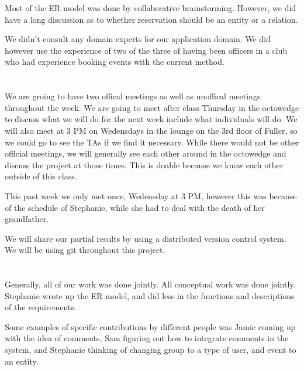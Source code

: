 \documentclass{article}
\begin{document}
Most of the ER model was done by collaberative brainstorming. However, we did
have a long discussion as to whether reservation should be an entity or a
relation.  

We didn't consult any domain experts for our application domain. We did however
use the experience of two of the three of having been officers in a club who had
experience booking events with the current method. 

\section{}
We are groing to have two offical meetings as well as unoffical meetings
throughout the week. We are going to meet after class Thursday in the octowedge
to discuss what we will do for the next week include what individuals will do.
We will also meet at 3 PM on Wedensdays in the lounge on the 3rd floor of
Fuller, so we could go to see the TAs if we find it necessary. While there would
not be other official meetings, we will generally see each other around in the
octowedge and discuss the project at those times. This is doable because we know
each other outside of this class. 

This past week we only met once, Wedensday at 3 PM, however this was because of
the schedule of Stephanie, while she had to deal with the death of her
grandfather. 

We will share our partial results by using a distributed version control system.
We will be using git throughout this project. 

\section{}
Generally, all of our work was done jointly. All conceptual work was done
jointly. Stephanie wrote up the ER model, and did less in the
functions and descriptions of the requirements. 

Some examples of specific contributions by different people was Jamie coming up
with the idea of comments, Sam figuring out how to integrate comments
in the system, and Stephanie thinking of changing group to a type of user, and
event to an entity. 


\end{document}
